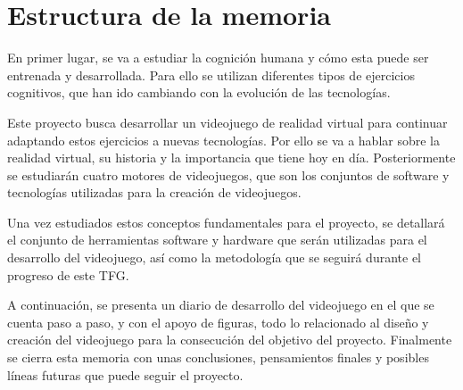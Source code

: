 \section{Estructura de la memoria}

En primer lugar, se va a estudiar la cognición humana y cómo esta puede ser entrenada y desarrollada. Para ello se utilizan diferentes tipos de ejercicios cognitivos, que han ido cambiando con la evolución de las tecnologías. 

Este proyecto busca desarrollar un videojuego de realidad virtual para continuar adaptando estos ejercicios a nuevas tecnologías. Por ello se va a hablar sobre la realidad virtual, su historia y la importancia que tiene hoy en día. Posteriormente se estudiarán cuatro motores de videojuegos, que son los conjuntos de software y tecnologías utilizadas para la creación de videojuegos.

Una vez estudiados estos conceptos fundamentales para el proyecto, se detallará el conjunto de herramientas software y hardware que serán utilizadas para el desarrollo del videojuego, así como la metodología que se seguirá durante el progreso de este TFG.

A continuación, se presenta un diario de desarrollo del videojuego en el que se cuenta paso a paso, y con el apoyo de figuras, todo lo relacionado al diseño y creación del videojuego para la consecución del objetivo del proyecto. Finalmente se cierra esta memoria con unas conclusiones, pensamientos finales y posibles líneas futuras que puede seguir el proyecto.





\chapterend
